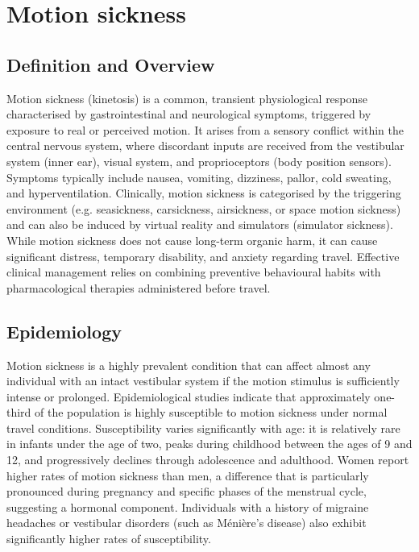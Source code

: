 \chapter{Motion sickness}

\section*{Definition and Overview}
Motion sickness (kinetosis) is a common, transient physiological response characterised by gastrointestinal and neurological symptoms, triggered by exposure to real or perceived motion. It arises from a sensory conflict within the central nervous system, where discordant inputs are received from the vestibular system (inner ear), visual system, and proprioceptors (body position sensors). Symptoms typically include nausea, vomiting, dizziness, pallor, cold sweating, and hyperventilation. Clinically, motion sickness is categorised by the triggering environment (e.g. seasickness, carsickness, airsickness, or space motion sickness) and can also be induced by virtual reality and simulators (simulator sickness). While motion sickness does not cause long-term organic harm, it can cause significant distress, temporary disability, and anxiety regarding travel. Effective clinical management relies on combining preventive behavioural habits with pharmacological therapies administered before travel.

\section*{Epidemiology}
Motion sickness is a highly prevalent condition that can affect almost any individual with an intact vestibular system if the motion stimulus is sufficiently intense or prolonged. Epidemiological studies indicate that approximately one-third of the population is highly susceptible to motion sickness under normal travel conditions. Susceptibility varies significantly with age: it is relatively rare in infants under the age of two, peaks during childhood between the ages of 9 and 12, and progressively declines through adolescence and adulthood. Women report higher rates of motion sickness than men, a difference that is particularly pronounced during pregnancy and specific phases of the menstrual cycle, suggesting a hormonal component. Individuals with a history of migraine headaches or vestibular disorders (such as Ménière's disease) also exhibit significantly higher rates of susceptibility.

